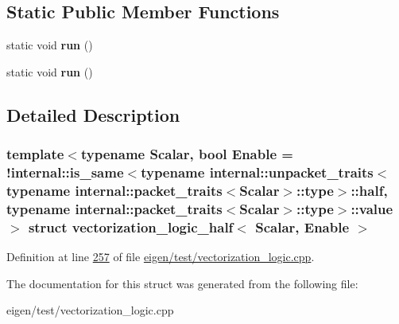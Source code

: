 \subsection*{Static Public Member Functions}
\begin{DoxyCompactItemize}
\item 
\mbox{\label{structvectorization__logic__half_a27a0f75f85861aae7be5ec4a792c2380}} 
static void {\bfseries run} ()
\item 
\mbox{\label{structvectorization__logic__half_a27a0f75f85861aae7be5ec4a792c2380}} 
static void {\bfseries run} ()
\end{DoxyCompactItemize}


\subsection{Detailed Description}
\subsubsection*{template$<$typename Scalar, bool Enable = !internal\+::is\+\_\+same$<$typename internal\+::unpacket\+\_\+traits$<$typename internal\+::packet\+\_\+traits$<$\+Scalar$>$\+::type$>$\+::half,                                                           typename internal\+::packet\+\_\+traits$<$\+Scalar$>$\+::type$>$\+::value$>$\newline
struct vectorization\+\_\+logic\+\_\+half$<$ Scalar, Enable $>$}



Definition at line \hyperlink{eigen_2test_2vectorization__logic_8cpp_source_l00257}{257} of file \hyperlink{eigen_2test_2vectorization__logic_8cpp_source}{eigen/test/vectorization\+\_\+logic.\+cpp}.



The documentation for this struct was generated from the following file\+:\begin{DoxyCompactItemize}
\item 
eigen/test/vectorization\+\_\+logic.\+cpp\end{DoxyCompactItemize}
